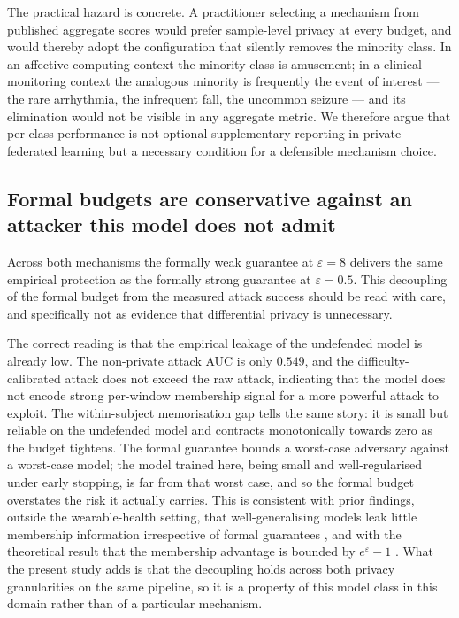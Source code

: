 The practical hazard is concrete. A practitioner selecting a mechanism from
published aggregate scores would prefer sample-level privacy at every budget, and
would thereby adopt the configuration that silently removes the minority class.
In an affective-computing context the minority class is amusement; in a clinical
monitoring context the analogous minority is frequently the event of interest ---
the rare arrhythmia, the infrequent fall, the uncommon seizure --- and its
elimination would not be visible in any aggregate metric. We therefore argue that
per-class performance is not optional supplementary reporting in private
federated learning but a necessary condition for a defensible mechanism choice.

\subsection{Formal budgets are conservative against an attacker this model does
not admit}
\label{sec:disc-formal-empirical}

Across both mechanisms the formally weak guarantee at $\varepsilon = 8$ delivers
the same empirical protection as the formally strong guarantee at
$\varepsilon = 0.5$. This decoupling of the formal budget from the measured
attack success should be read with care, and specifically not as evidence that
differential privacy is unnecessary.

The correct reading is that the empirical leakage of the undefended model is
already low. The non-private attack AUC is only $0.549$, and the
difficulty-calibrated attack does not exceed the raw attack, indicating that the
model does not encode strong per-window membership signal for a more powerful
attack to exploit. The within-subject memorisation gap tells the same story: it
is small but reliable on the undefended model and contracts monotonically towards
zero as the budget tightens. The formal guarantee bounds a worst-case adversary
against a worst-case model; the model trained here, being small and
well-regularised under early stopping, is far from that worst case, and so the
formal budget overstates the risk it actually carries. This is consistent with
prior findings, outside the wearable-health setting, that well-generalising
models leak little membership information irrespective of formal guarantees
\cite{[verify: generalisation-vs-DP, arXiv 2110.05524]}, and with the theoretical
result that the membership advantage is bounded by $e^{\varepsilon}-1$
\cite{[verify: Yeom 2018]}. What the present study adds is that the decoupling
holds across both privacy granularities on the same pipeline, so it is a property
of this model class in this domain rather than of a particular mechanism.

